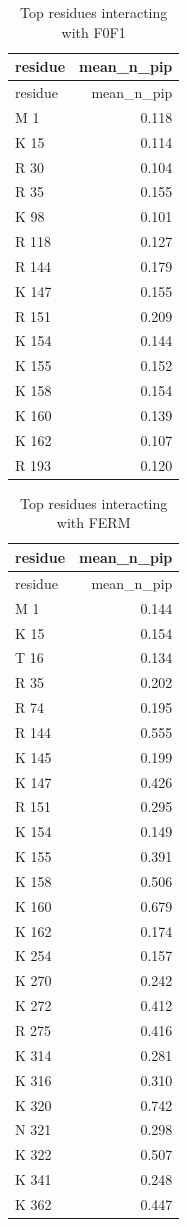 \documentclass[
  twocolumn]{biophys-new-mod}
\begin{document}
\twocolumn

\hypertarget{tbl-f0f1-top-interacting}{}
\begin{longtable}[]{@{}lr@{}}
\caption{\label{tbl-f0f1-top-interacting}Top residues interacting with
F0F1}\tabularnewline
\toprule()
residue & mean\_n\_pip \\
\midrule()
\endfirsthead
\toprule()
residue & mean\_n\_pip \\
\midrule()
\endhead
M 1 & 0.118 \\
K 15 & 0.114 \\
R 30 & 0.104 \\
R 35 & 0.155 \\
K 98 & 0.101 \\
R 118 & 0.127 \\
R 144 & 0.179 \\
K 147 & 0.155 \\
R 151 & 0.209 \\
K 154 & 0.144 \\
K 155 & 0.152 \\
K 158 & 0.154 \\
K 160 & 0.139 \\
K 162 & 0.107 \\
R 193 & 0.120 \\
\bottomrule()
\end{longtable}

\hypertarget{tbl-ferm-top-interacting}{}
\begin{longtable}[]{@{}lr@{}}
\caption{\label{tbl-ferm-top-interacting}Top residues interacting with
FERM}\tabularnewline
\toprule()
residue & mean\_n\_pip \\
\midrule()
\endfirsthead
\toprule()
residue & mean\_n\_pip \\
\midrule()
\endhead
M 1 & 0.144 \\
K 15 & 0.154 \\
T 16 & 0.134 \\
R 35 & 0.202 \\
R 74 & 0.195 \\
R 144 & 0.555 \\
K 145 & 0.199 \\
K 147 & 0.426 \\
R 151 & 0.295 \\
K 154 & 0.149 \\
K 155 & 0.391 \\
K 158 & 0.506 \\
K 160 & 0.679 \\
K 162 & 0.174 \\
K 254 & 0.157 \\
K 270 & 0.242 \\
K 272 & 0.412 \\
R 275 & 0.416 \\
K 314 & 0.281 \\
K 316 & 0.310 \\
K 320 & 0.742 \\
N 321 & 0.298 \\
K 322 & 0.507 \\
K 341 & 0.248 \\
K 362 & 0.447 \\
\bottomrule()
\end{longtable}
\end{document}
